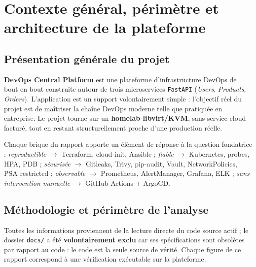 \documentclass[12pt,a4paper,oneside]{report}
\makeatletter
\def\cleardoublepage{\clearpage\if@twoside
  \ifodd\c@page\else\hbox{}\thispagestyle{empty}\newpage\fi\fi}
\makeatother
\begin{document}
\cleardoublepage

\chapter[Contexte général et architecture]{Contexte général, périmètre et architecture de la plateforme}

\section{Présentation générale du projet}

\textbf{DevOps Central Platform} est une plateforme d'infrastructure DevOps de bout en bout construite autour de trois microservices \texttt{FastAPI} (\emph{Users}, \emph{Products}, \emph{Orders}). L'application est un support volontairement simple : l'objectif réel du projet est de maîtriser la chaîne DevOps moderne telle que pratiquée en entreprise. Le projet tourne sur un \textbf{homelab libvirt/KVM}, sans service cloud facturé, tout en restant structurellement proche d'une production réelle.

Chaque brique du rapport apporte un élément de réponse à la question fondatrice : \emph{reproductible} $\rightarrow$ Terraform, cloud-init, Ansible ; \emph{fiable} $\rightarrow$ Kubernetes, probes, HPA, PDB ; \emph{sécurisée} $\rightarrow$ Gitleaks, Trivy, pip-audit, Vault, NetworkPolicies, PSA restricted ; \emph{observable} $\rightarrow$ Prometheus, AlertManager, Grafana, ELK ; \emph{sans intervention manuelle} $\rightarrow$ GitHub Actions + ArgoCD.

\section{Méthodologie et périmètre de l'analyse}

Toutes les informations proviennent de la lecture directe du code source actif ; le dossier \texttt{docs/} a été \textbf{volontairement exclu} car ses spécifications sont obsolètes par rapport au code : le code est la seule source de vérité. Chaque figure de ce rapport correspond à une vérification exécutable sur la plateforme.

\end{document}
